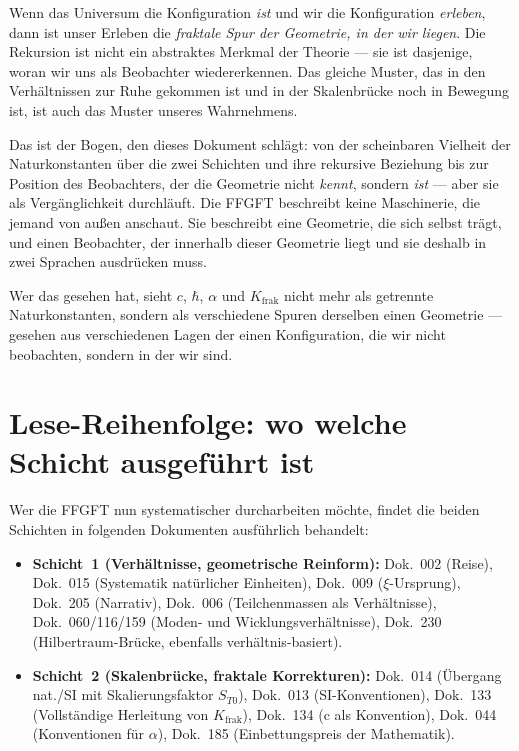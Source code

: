Wenn das Universum die Konfiguration \emph{ist} und wir die Konfiguration
\emph{erleben}, dann ist unser Erleben die \emph{fraktale Spur der
Geometrie, in der wir liegen}. Die Rekursion ist nicht ein abstraktes
Merkmal der Theorie --- sie ist dasjenige, woran wir uns als Beobachter
wiedererkennen. Das gleiche Muster, das in den Verhältnissen zur Ruhe
gekommen ist und in der Skalenbrücke noch in Bewegung ist, ist auch
das Muster unseres Wahrnehmens.

\medskip

Das ist der Bogen, den dieses Dokument schlägt: von der scheinbaren
Vielheit der Naturkonstanten über die zwei Schichten und ihre rekursive
Beziehung bis zur Position des Beobachters, der die Geometrie nicht
\emph{kennt}, sondern \emph{ist} --- aber sie als Vergänglichkeit
durchläuft. Die FFGFT beschreibt keine Maschinerie, die jemand von
außen anschaut. Sie beschreibt eine Geometrie, die sich selbst trägt,
und einen Beobachter, der innerhalb dieser Geometrie liegt und sie
deshalb in zwei Sprachen ausdrücken muss.

Wer das gesehen hat, sieht $c$, $\hbar$, $\alpha$ und $K_{\mathrm{frak}}$
nicht mehr als getrennte Naturkonstanten, sondern als verschiedene
Spuren derselben einen Geometrie --- gesehen aus verschiedenen Lagen
der einen Konfiguration, die wir nicht beobachten, sondern in der wir
sind.

\section{Lese-Reihenfolge: wo welche Schicht ausgeführt ist}

Wer die FFGFT nun systematischer durcharbeiten möchte, findet die
beiden Schichten in folgenden Dokumenten ausführlich behandelt:

\begin{itemize}\setlength\itemsep{0pt}
  \item \textbf{Schicht~1 (Verhältnisse, geometrische Reinform):}
    Dok.~002 (Reise), Dok.~015 (Systematik natürlicher Einheiten),
    Dok.~009 ($\xi$-Ursprung), Dok.~205 (Narrativ),
    Dok.~006 (Teilchenmassen als Verhältnisse),
    Dok.~060/116/159 (Moden- und Wicklungsverhältnisse),
    Dok.~230 (Hilbertraum-Brücke, ebenfalls verhältnis-basiert).
  \item \textbf{Schicht~2 (Skalenbrücke, fraktale Korrekturen):}
    Dok.~014 (Übergang nat./SI mit Skalierungsfaktor $S_{T0}$),
    Dok.~013 (SI-Konventionen), Dok.~133 (Vollständige Herleitung von
    $K_{\mathrm{frak}}$), Dok.~134 (c als Konvention), Dok.~044
    (Konventionen für $\alpha$),
    Dok.~185 (Einbettungspreis der Mathematik).
\end{itemize}

